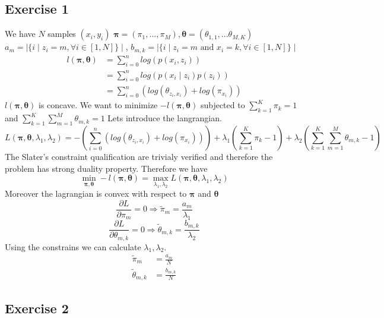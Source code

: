\documentclass[a4paper]{article}
\begin{document}
\subsection{Exercise 1}
We have $N$ samples $(x_i,y_i)$
$\pmb{\pi} = (\pi_1, ..., \pi_M), \pmb{\theta} = (\theta_{1,1}, ... \theta_{M,K})$	\\
$a_m = \mid \{ i \mid  z_i = m, \forall i \in [1,N]\}\mid $, $b_{m,k} = \mid \{ i \mid  z_i = m \text{ and } x_i = k, \forall i \in [1,N]\}\mid $
\begin{align*}
l(\pmb{\pi}, \pmb{\theta}) &= \sum_{i=0}^n log(p(x_i,z_i)) \\
&= \sum_{i=0}^n log(p(x_i \mid  z_i)p(z_i))\\
&= \sum_{i=0}^n (log(\theta_{z_i,x_i}) + log(\pi_{x_i}))
\end{align*}
$l(\pmb{\pi}, \pmb{\theta})$ is concave. We want to minimize $- l(\pmb{\pi}, \pmb{\theta})$ subjected to $\sum_{k=1}^K \pi_k = 1$ and $\sum_{k=1}^K \sum_{m=1}^M \theta_{m,k} = 1$
Lets introduce the langrangian.
$$ L(\pmb{\pi}, \pmb{\theta}, \lambda_1, \lambda_2) = - (\sum_{i=0}^n (log(\theta_{z_i,x_i}) + log(\pi_{x_i}))) + \lambda_1(\sum_{k=1}^K \pi_k - 1) + \lambda_2(\sum_{k=1}^K \sum_{m=1}^M \theta_{m,k} - 1) $$
The Slater’s constraint qualification are trivialy verified and therefore the problem has strong duality property. Therefore we have
$$ \min_{\pmb{\pi}, \pmb{\theta}} - l(\pmb{\pi}, \pmb{\theta}) = \max_{\lambda_1, \lambda_2}  L(\pmb{\pi}, \pmb{\theta}, \lambda_1, \lambda_2) $$
Moreover the lagrangian is convex with respect to $\pmb{\pi}$ and $\pmb{\theta}$
$$ \frac{\partial L}{\partial \pi_m} = 0 \Rightarrow \tilde{\pi}_m = \frac{a_m}{\lambda_1}$$
$$ \frac{\partial L}{\partial \theta_{m,k}} = 0 \Rightarrow \tilde{\theta}_{m,k} = \frac{b_{m,k}}{\lambda_2}$$
Using the constrains we can calculate $\lambda_1, \lambda_2$.
\begin{align*}
\tilde{\pi}_m &= \frac{a_m}{N} \\
\tilde{\theta}_{m,k} &= \frac{b_{m,k}}{N}
\end{align*}

\subsection{Exercise 2}
\end{document}
